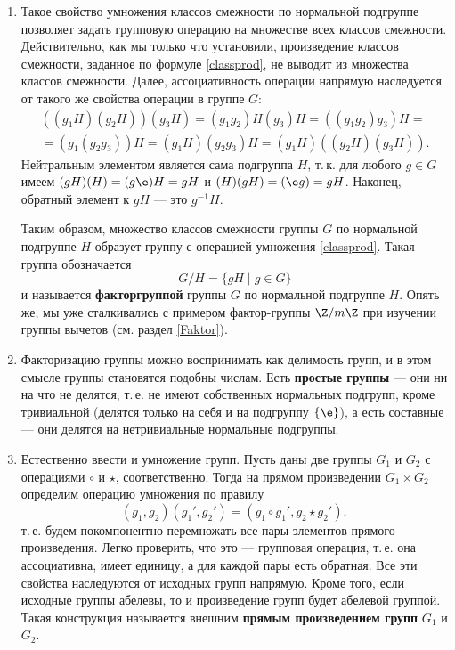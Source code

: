 \begin{enumerate}
\item Такое свойство умножения классов смежности по нормальной подгруппе позволяет задать групповую операцию на множестве всех классов смежности. Действительно, как мы только что установили, произведение классов смежности, заданное по формуле \eqref{classprod}, не выводит из множества классов смежности. Далее, ассоциативность операции напрямую наследуется от такого же свойства операции в группе $G$:
\begin{multline*}
((g_1H)(g_2H))(g_3H)=(g_1g_2)H(g_3)H=((g_1g_2)g_3)H=\\ 
=(g_1(g_2g_3))H=(g_1H)(g_2g_3)H = (g_1H)((g_2H)(g_3H)).
\end{multline*}
Нейтральным элементом является сама подгруппа $H$, т.\,к. для любого $g\in G$ имеем $(gH)(H)=(g\e)H=gH$ и $(H)(gH)=(\e g)=gH$. Наконец, обратный элемент к $gH$ --- это $g^{-1}H$.

Таким образом, множество классов смежности группы $G$ по нормальной подгруппе $H$ образует группу с операцией умножения \eqref{classprod}. Такая группа обозначается
$$
G/H = \{gH\mid g\in G\}
$$
и называется \textbf{факторгруппой} группы $G$ по нормальной подгруппе $H$. Опять же, мы уже сталкивались с примером фактор-группы $\Z/m\Z$ при изучении группы вычетов (см. раздел \ref{Faktor}).

\item Факторизацию группы можно воспринимать как делимость групп, и в этом смысле группы становятся подобны числам. Есть \textbf{простые группы} --- они ни на что не делятся, т.\,е. не имеют собственных нормальных подгрупп, кроме тривиальной (делятся только на себя и на подгруппу $\{\e\}$), а есть составные --- они делятся на нетривиальные нормальные подгруппы.

\item Естественно ввести и умножение групп. Пусть даны две группы $G_1$ и $G_2$ с операциями $\circ$ и $\star$, соответственно. Тогда на прямом произведении $G_1\times G_2$ определим операцию умножения по правилу
$$
(g_1,g_2)(g_1',g_2') = (g_1\circ g_1', g_2\star g_2'),
$$
т.\,е. будем покомпонентно перемножать все пары элементов прямого произведения. Легко проверить, что это --- групповая операция, т.\,е. она ассоциативна, имеет единицу, а для каждой пары есть обратная. Все эти свойства наследуются от исходных групп напрямую. Кроме того, если исходные группы абелевы, то и произведение групп будет абелевой группой. Такая конструкция называется внешним \textbf{прямым произведением групп} $G_1$ и $G_2$.


\end{enumerate}
